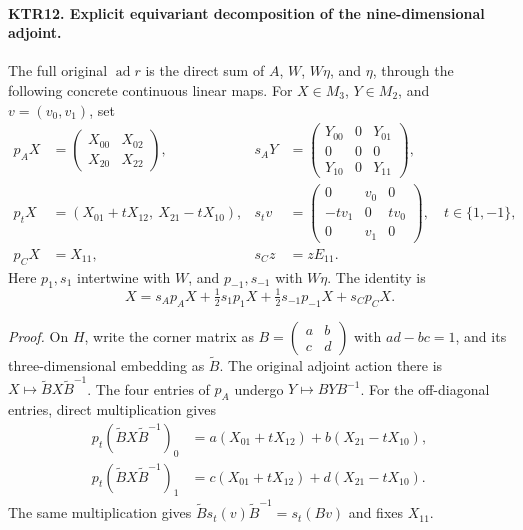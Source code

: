 \paragraph{KTR12. Explicit equivariant decomposition of the nine-dimensional adjoint.}
\label{claim:KTR12}
The full original \(\operatorname{ad}r\) is the direct sum
of \(A\), \(W\), \(W\eta\), and \(\eta\), through
the following concrete continuous linear maps.  For
\(X\in M_3\), \(Y\in M_2\), and \(v=(v_0,v_1)\), set
\[
 \begin{aligned}
 p_A X&=\begin{pmatrix}X_{00}&X_{02}\\X_{20}&X_{22}\end{pmatrix},
 &s_A Y&=\begin{pmatrix}Y_{00}&0&Y_{01}\\0&0&0\\Y_{10}&0&Y_{11}\end{pmatrix},\\
 p_tX&=(X_{01}+tX_{12},\ X_{21}-tX_{10}),
 &s_tv&=\begin{pmatrix}0&v_0&0\\-t v_1&0&t v_0\\0&v_1&0\end{pmatrix},
 \quad t\in\{1,-1\},\\
 p_CX&=X_{11},&s_Cz&=zE_{11}.
 \end{aligned}
 \tag{KTR.18}
\]
Here \(p_1,s_1\) intertwine with \(W\), and
\(p_{-1},s_{-1}\) with \(W\eta\).  The identity is
\[
       X=s_Ap_AX+\tfrac12s_1p_1X+
                       \tfrac12s_{-1}p_{-1}X+s_Cp_CX.
 \tag{KTR.19}
\]

\emph{Proof.}
On \(H\), write the corner matrix as
\(B=\left(\begin{smallmatrix}a&b\\c&d\end{smallmatrix}\right)\)
with \(ad-bc=1\), and its three-dimensional embedding as
\(\widetilde B\).  The original adjoint action there is
\(X\mapsto\widetilde B X\widetilde B^{-1}\).
The four entries of \(p_A\) undergo \(Y\mapsto BYB^{-1}\).
For the off-diagonal entries, direct multiplication gives
\[
 \begin{split}
 p_t(\widetilde B X\widetilde B^{-1})_0
       &=a(X_{01}+tX_{12})+b(X_{21}-tX_{10}),\\
 p_t(\widetilde B X\widetilde B^{-1})_1
       &=c(X_{01}+tX_{12})+d(X_{21}-tX_{10}).
 \end{split}
\]
The same multiplication gives
\(\widetilde B s_t(v)\widetilde B^{-1}=s_t(Bv)\)
and fixes \(X_{11}\).

